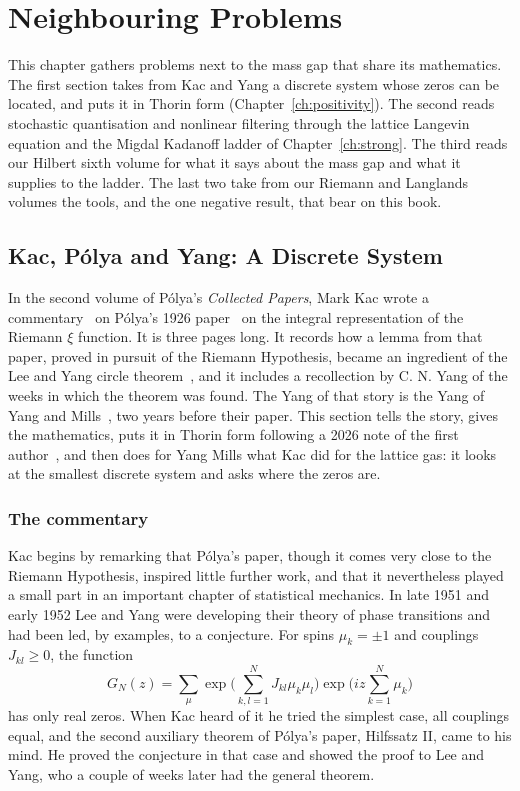 \chapter{Neighbouring Problems}\label{ch:kacyang}

This chapter gathers problems next to the mass gap that share its mathematics. The first section takes from Kac and Yang a discrete system whose zeros can be located, and puts it in Thorin form (Chapter~\ref{ch:positivity}). The second reads stochastic quantisation and nonlinear filtering through the lattice Langevin equation and the Migdal Kadanoff ladder of Chapter~\ref{ch:strong}. The third reads our Hilbert sixth volume for what it says about the mass gap and what it supplies to the ladder. The last two take from our Riemann and Langlands volumes the tools, and the one negative result, that bear on this book.

\section{Kac, P\'olya and Yang: A Discrete System}

In the second volume of P\'olya's \emph{Collected Papers}, Mark Kac wrote a commentary~\cite{Ka74} on P\'olya's 1926 paper~\cite{Po26} on the integral representation of the Riemann $\xi$ function. It is three pages long. It records how a lemma from that paper, proved in pursuit of the Riemann Hypothesis, became an ingredient of the Lee and Yang circle theorem~\cite{LY52}, and it includes a recollection by C. N. Yang of the weeks in which the theorem was found. The Yang of that story is the Yang of Yang and Mills~\cite{YM54}, two years before their paper. This section tells the story, gives the mathematics, puts it in Thorin form following a 2026 note of the first author~\cite{Po26b}, and then does for Yang Mills what Kac did for the lattice gas: it looks at the smallest discrete system and asks where the zeros are.

\subsection{The commentary}

Kac begins by remarking that P\'olya's paper, though it comes very close to the Riemann Hypothesis, inspired little further work, and that it nevertheless played a small part in an important chapter of statistical mechanics. In late 1951 and early 1952 Lee and Yang were developing their theory of phase transitions and had been led, by examples, to a conjecture. For spins $\mu_k=\pm1$ and couplings $J_{kl}\ge0$, the function
\[
G_N(z)=\sum_{\mu}\exp\Big(\sum_{k,l=1}^NJ_{kl}\mu_k\mu_l\Big)\exp\Big(iz\sum_{k=1}^N\mu_k\Big)
\]
has only real zeros. When Kac heard of it he tried the simplest case, all couplings equal, and the second auxiliary theorem of P\'olya's paper, Hilfssatz II, came to his mind. He proved the conjecture in that case and showed the proof to Lee and Yang, who a couple of weeks later had the general theorem.


